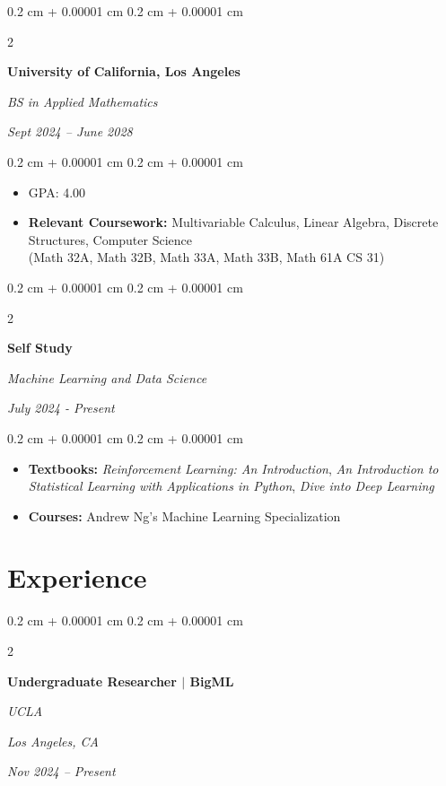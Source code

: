 \documentclass[10pt, letterpaper]{article}
\newenvironment{highlights}{
    \begin{itemize}[
        topsep=0.10 cm,
        parsep=0.10 cm,
        partopsep=0pt,
        itemsep=0pt,
        leftmargin=0.4 cm + 10pt
    ]
}{
    \end{itemize}
} %
\newenvironment{onecolentry}{
    \begin{adjustwidth}{
        0.2 cm + 0.00001 cm
    }{
        0.2 cm + 0.00001 cm
    }
}{
    \end{adjustwidth}
} %
\newenvironment{twocolentry}[2][]{
    \onecolentry
    \def\secondColumn{#2}
    \setcolumnwidth{\fill, 4.5 cm}
    \begin{paracol}{2}
}{
    \switchcolumn \raggedleft \secondColumn
    \end{paracol}
    \endonecolentry
} %
\let\hrefWithoutArrow\href
\renewcommand{\href}[2]{\hrefWithoutArrow{#1}{\ifthenelse{\equal{#2}{}}{ }{#2 }\raisebox{.15ex}{\footnotesize \faExternalLink*}}}
\begin{document}
        
        \begin{twocolentry}{
            
            
        \textit{Sept 2024 – June 2028}}
            \textbf{University of California, Los Angeles}

            \textit{BS in Applied Mathematics}
        \end{twocolentry}

        \vspace{0.10 cm}
        \begin{onecolentry}
            \begin{highlights}
                \item GPA: 4.00 %
                \item \textbf{Relevant Coursework:}  Multivariable Calculus, Linear Algebra, Discrete Structures, Computer Science \\ (Math 32A, Math 32B, Math 33A, Math 33B, Math 61A CS 31)
            \end{highlights}
        \end{onecolentry}

        \vspace{0.2 cm}
        
        \begin{twocolentry}{
            
            
        \textit{July 2024 - Present}}
            \textbf{Self Study}

            \textit{Machine Learning and Data Science}
        \end{twocolentry}

        \vspace{0.10 cm}
        \begin{onecolentry}
            \begin{highlights}
                \item \textbf{Textbooks:}  \textit {Reinforcement Learning:
An Introduction}, \textit {An Introduction to Statistical Learning with Applications in Python}, \textit{Dive into Deep Learning} 
            \item 
            \textbf{Courses:}  Andrew Ng's Machine Learning Specialization

            \end{highlights}
        \end{onecolentry}



    
    \section{Experience}
        \begin{twocolentry}{
        \textit{Los Angeles, CA}    
            
        \textit{Nov 2024 – Present}}
            \textbf{Undergraduate Researcher $|$ BigML}
            
            \textit{UCLA}
        \end{twocolentry}
\end{document}
